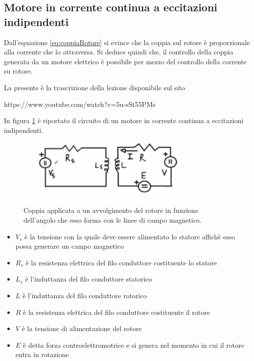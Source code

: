 \documentclass[17pt]{extarticle}
\begin{document}
\subsection{Motore in corrente continua a eccitazioni indipendenti}


Dall'equazione \ref{eq:coppiaRotore} si evince che la coppia sul rotore è proporzionale alla corrente che lo attraversa. Si deduce quindi che, il controllo della coppia generata da un motore elettrico è possibile per mezzo del controllo della corrente su rotore.


La presente è la trascrizione della lezione disponibile sul sito

https://www.youtube.com/watch?v=5u-sSt55PMs

In figura \ref{fig:motoreDC_eccitazio indipendenti} è riportato il circuito di un motore in corrente continua a eccitazioni indipendenti. 


\begin{figure}[th!]
	\centering
   	\includegraphics[width=3.3in]{motoreDC_eccitazioIndipendenti.png}
  	\caption{Coppia applicata a un avvolgimento del rotore in funzione dell'angolo che esso forma con le linee di campo magnetico.}
   	\label{fig:motoreDC_eccitazio indipendenti}
\end{figure}


\begin{itemize}
	\item $V_s$ è la tensione con la quale deve essere alimentato lo statore affichè esso possa generare un campo magnetico
	\item $R_s$ è la resistenza elettrica del filo conduttore costituente lo statore
	\item $L_s$ è l'induttanza del filo conduttore statorico
	\item $L$ è l'induttanza del filo conduttore rotorico
	\item $R$ è la resistenza elettrica del filo conduttore costituente il rotore
	\item $V$ è la tensione di alimentazione del rotore
	\item $E$ è detta forza controelettromotrice e si genera nel momento in cui il rotore entra in rotazione
\end{itemize}
\end{document}
